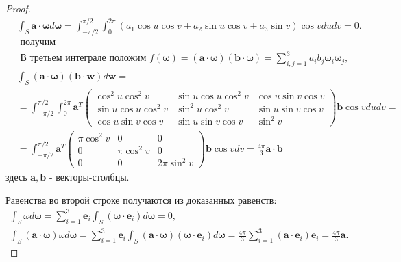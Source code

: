 \begin{proof}
    \[
        \begin{aligned}
            & \int_{S} \mathbf{a} \cdot \boldsymbol{\omega} d \boldsymbol{\omega}=
            \int_{-\pi / 2}^{\pi / 2}
            \int_{0}^{2 \pi}\left(a_{1} \cos u \cos v+
            a_{2} \sin u \cos v+a_{3} \sin v\right) \cos v d u d v=0. \\
            & \text { получим } \\
            & \text { В третьем интеграле положим }
            f(\boldsymbol{\omega})=(\mathbf{a} \cdot \boldsymbol{\omega})(\mathbf{b}
            \cdot \boldsymbol{\omega})=\sum_{i, j=1}^{3} a_{i} b_{j}
            \boldsymbol{\omega}_{i} \boldsymbol{\omega}_{j} \text {, } \\
            & \int_{S}(\mathbf{a} \cdot \boldsymbol{\omega})(\mathbf{b}
            \cdot \boldsymbol{w}) d \boldsymbol{w}= \\
            & =\int_{-\pi / 2}^{\pi / 2} \int_{0}^{2 \pi}
            \mathbf{a}^{T}\left(\begin{array}{ccc}
                                    \cos ^{2} u \cos ^{2} v & \sin u \cos u \cos ^{2} v
                                    & \cos u \sin v \cos v \\\sin u \cos u \cos ^{2} v
                                    & \sin ^{2} u \cos ^{2} v
                                    & \sin u \sin v \cos v \\\cos u \sin v \cos v
                                    & \sin u \sin v \cos v & \sin ^{2} v
            \end{array}\right) \mathbf{b} \cos v d u d v= \\
            & =\int_{-\pi / 2}^{\pi / 2} \mathbf{a}^{T}\left(
            \begin{array}{ccc}
                \pi \cos ^{2} v & 0 & 0 \\0 & \pi \cos ^{2} v & 0 \\0 & 0 & 2 \pi \sin ^{2} v
            \end{array}\right) \mathbf{b} \cos v d v=\frac{4 \pi}{3} \mathbf{a} \cdot \mathbf{b}
        \end{aligned}
    \]
    здесь $\mathbf{a}, \mathbf{b}$ - векторы-столбцы.


    Равенства во второй строке получаются из доказанных равенств:
    \[
        \begin{gathered}
            \int_{S} \omega d \boldsymbol{\omega}=\sum_{i=1}^{3} \mathbf{e}_{i}
            \int_{S}\left(\boldsymbol{\omega}
            \cdot \mathbf{e}_{i}\right) d \boldsymbol{\omega}=0, \\
            \int_{S}(\mathbf{a} \cdot \boldsymbol{\omega}) \omega d
            \boldsymbol{\omega}=\sum_{i=1}^{3} \mathbf{e}_{i}
            \int_{S}(\mathbf{a} \cdot \boldsymbol{\omega})\left(\boldsymbol{\omega}
            \cdot \mathbf{e}_{i}\right) d
            \boldsymbol{\omega}=\frac{4 \pi}{3} \sum_{i=1}^{3}\left(\mathbf{a}
            \cdot \mathbf{e}_{i}\right)
            \mathbf{e}_{i}=\frac{4 \pi}{3} \mathbf{a}.
        \end{gathered}
    \]



\end{proof}
